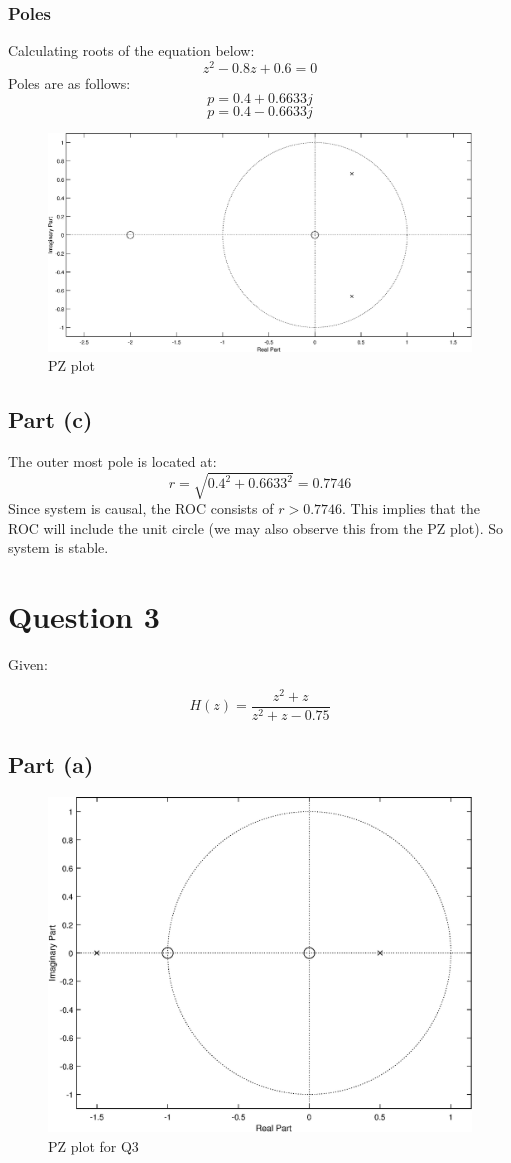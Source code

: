 \documentclass[12pt,letterpaper]{article}
\begin{document}
\subsubsection*{Poles}
Calculating roots of the equation below: 
\[
    z^2-0.8z+0.6 = 0
\]
Poles are as follows: 
\[
    p = 0.4 + 0.6633j
\]
\[
    p = 0.4 - 0.6633j
\]
\begin{figure}[h]
    \centering
    \includegraphics[scale=0.5]{figures/q2task3.eps}
    \caption{PZ plot}
    \label{PZq2}
\end{figure}
\subsection*{Part (c)}
The outer most pole is located at: 
\[
    r = \sqrt{0.4^2 +0.6633^2} = 0.7746
\]
Since system is causal, the ROC consists of $r>0.7746$. This implies that the ROC will include the unit circle (we may also observe this from the PZ plot). So system is stable. 
\pagebreak
\section*{Question 3}
Given: 

\[
    H(z) = \dfrac{z^2+z}{z^2+z-0.75}
\]
\subsection*{Part (a)}
\begin{figure}[!h]
    \centering
    \includegraphics[scale=0.5]{figures/q3task1.eps}
    \caption{PZ plot for Q3}
    \label{PZq3}
\end{figure}
\end{document}
